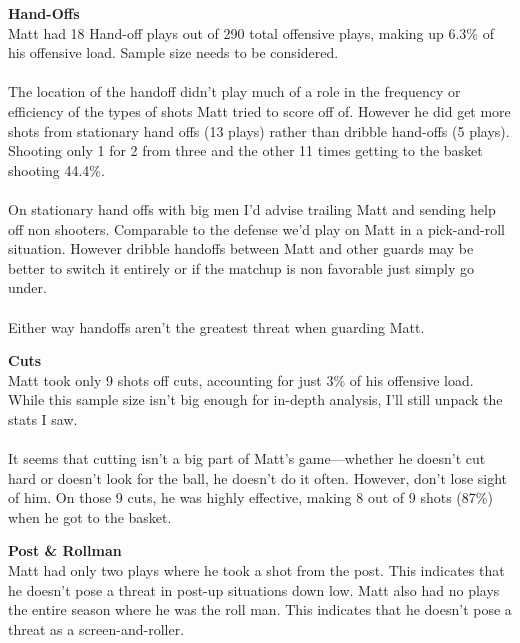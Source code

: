 \documentclass[a4paper,12pt]{article}
\begin{document}
\begin{multicols}{2}
    {\large \noindent \textbf{Hand-Offs}} \\ 
    Matt had 18 Hand-off plays out of 290 total offensive plays, making up 6.3\% of his offensive load. Sample size needs to be considered. \\ \\
    The location of the handoff didn’t play much of a role in the frequency or efficiency of the types of shots Matt tried to score off of. However he did get more shots from stationary hand offs (13 plays) rather than dribble hand-offs (5 plays). Shooting only 1 for 2 from three and the other 11 times getting to the basket shooting 44.4\%.  \\ \\
    On stationary hand offs with big men I’d advise trailing Matt and sending help off non shooters. Comparable to the defense we’d play on Matt in a pick-and-roll situation. However dribble handoffs between Matt and other guards may be better to switch it entirely or if the matchup is non favorable just simply go under. \\ \\
    Either way handoffs aren’t the greatest threat when guarding Matt. \vspace{1em}
    
    {\large \noindent \textbf{Cuts}} \\
    Matt took only 9 shots off cuts, accounting for just 3\% of his offensive load. While this sample size isn't big enough for in-depth analysis, I'll still unpack the stats I saw. \\ \\
    It seems that cutting isn't a big part of Matt's game—whether he doesn't cut hard or doesn't look for the ball, he doesn't do it often. However, don't lose sight of him. On those 9 cuts, he was highly effective, making 8 out of 9 shots (87\%) when he got to the basket. \vspace{1em}
    
    {\large \noindent \textbf{Post \& Rollman}} \\
    Matt had only two plays where he took a shot from the post. This indicates that he doesn't pose a threat in post-up situations down low.
    Matt also had no plays the entire season where he was the roll man. This indicates that he doesn't pose a threat as a screen-and-roller.


\end{multicols}


\newpage
\end{document}
